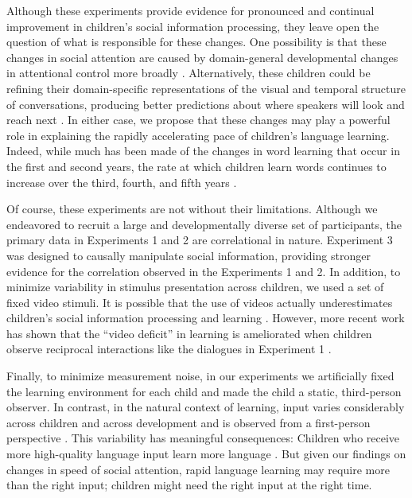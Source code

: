 \documentclass{pnastwo}
\begin{document}
\begin{article}
Although these experiments provide evidence for pronounced and continual improvement in children's social information processing, they leave open the question of what is responsible for these changes. One possibility is that these changes in social attention are caused by domain-general developmental changes in attentional control more broadly \citep{rueda2005,smith2013}. Alternatively, these children could be refining their domain-specific representations of the visual and temporal structure of conversations, producing better predictions about where speakers will look and reach next \citep{acheson2009,krogh-jespersen2015}. In either case, we propose that these changes may play a powerful role in explaining the rapidly accelerating pace of children's language learning. Indeed, while much has been made of the changes in word learning that occur in the first and second years, the rate at which children learn words continues to increase over the third, fourth, and fifth years \citep{bloom2000}.

Of course, these experiments are not without their limitations. Although we endeavored to recruit a large and developmentally diverse set of participants, the primary data in Experiments 1 and 2 are correlational in nature. Experiment 3 was designed to causally manipulate social information, providing stronger evidence for the correlation observed in the Experiments 1 and 2. In addition, to minimize variability in stimulus presentation across children, we used a set of fixed video stimuli. It is possible that the use of videos actually underestimates children's social information processing and learning \citep{anderson2005}. However, more recent work has shown that the ``video deficit'' in learning is ameliorated when children observe reciprocal interactions like the dialogues in Experiment 1  \citep{odoherty2011}.

Finally, to minimize measurement noise, in our experiments we artificially fixed the learning environment for each child and made the child a static, third-person observer. In contrast, in the natural context of learning, input varies considerably across children and across development and is observed from a first-person perspective \citep{yu2013}. This variability has meaningful consequences: Children who receive more high-quality language input learn more language \citep{weisleder2013}. But given our findings on changes in speed of social attention, rapid language learning may require more than the right input; children might need the right input at the right time.


\end{article}
\end{document}
